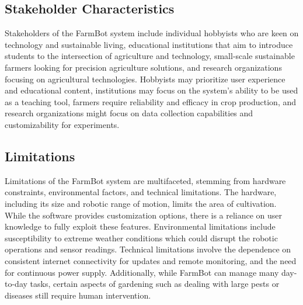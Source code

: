 \subsection{Stakeholder Characteristics}
Stakeholders of the FarmBot system include individual hobbyists who are keen on technology and sustainable living, educational institutions that aim to introduce students to the intersection of agriculture and technology, small-scale sustainable farmers looking for precision agriculture solutions, and research organizations focusing on agricultural technologies. Hobbyists may prioritize user experience and educational content, institutions may focus on the system’s ability to be used as a teaching tool, farmers require reliability and efficacy in crop production, and research organizations might focus on data collection capabilities and customizability for experiments.

\subsection{Limitations}
Limitations of the FarmBot system are multifaceted, stemming from hardware constraints, environmental factors, and technical limitations. The hardware, including its size and robotic range of motion, limits the area of cultivation. While the software provides customization options, there is a reliance on user knowledge to fully exploit these features. Environmental limitations include susceptibility to extreme weather conditions which could disrupt the robotic operations and sensor readings. Technical limitations involve the dependence on consistent internet connectivity for updates and remote monitoring, and the need for continuous power supply. Additionally, while FarmBot can manage many day-to-day tasks, certain aspects of gardening such as dealing with large pests or diseases still require human intervention.


